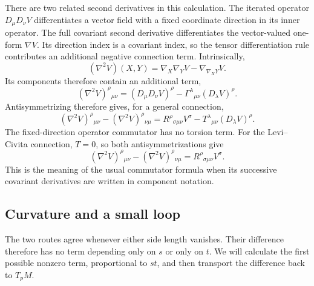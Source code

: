 \documentclass[11pt,a4paper]{article}
\numberwithin{equation}{section}
\begin{document}
There are two related second derivatives in this calculation. The
iterated operator \(D_\mu D_\nu V\) differentiates a vector field with a
fixed coordinate direction in its inner operator. The full covariant
second derivative differentiates the vector-valued one-form \(\nabla V\).
Its direction index is a covariant index, so the tensor differentiation
rule contributes an additional negative connection term. Intrinsically,
\[
 (\nabla^2V)(X,Y)
 =\nabla_X\nabla_YV-\nabla_{\nabla_XY}V.
\]
Its components therefore contain an additional term,
\[
 (\nabla^2V)^\rho{}_{\mu\nu}
 =(D_\mu D_\nu V)^\rho
  -\Gamma^\lambda{}_{\mu\nu}(D_\lambda V)^\rho.
\]
Antisymmetrizing therefore gives, for a general connection,
\[
 (\nabla^2V)^\rho{}_{\mu\nu}
 -(\nabla^2V)^\rho{}_{\nu\mu}
 =R^\rho{}_{\sigma\mu\nu}V^\sigma
  -T^\lambda{}_{\mu\nu}(D_\lambda V)^\rho.
\]
The fixed-direction operator commutator has no torsion term.
For the Levi--Civita connection, \(T=0\), so both antisymmetrizations give
\begin{equation}
 (\nabla^2V)^\rho{}_{\mu\nu}
 -(\nabla^2V)^\rho{}_{\nu\mu}
 =R^\rho{}_{\sigma\mu\nu}V^\sigma.
 \label{gr2:eq-curvature-commutator}
\end{equation}
This is the meaning of the usual commutator formula when its successive
covariant derivatives are written in component notation.

\subsection{Curvature and a small loop}

The two routes agree whenever either side length vanishes. Their
difference therefore has no term depending only on \(s\) or only on
\(t\). We will calculate the first possible nonzero term, proportional
to \(st\), and then transport the difference back to \(T_pM\).
\end{document}
